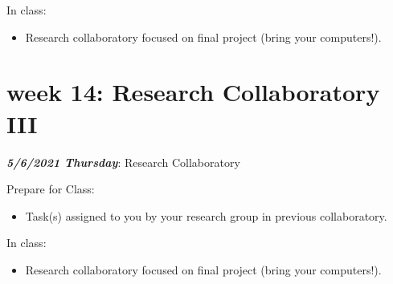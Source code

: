 \documentclass[
]{book}
\providecommand{\tightlist}{%
  \setlength{\itemsep}{0pt}\setlength{\parskip}{0pt}}
\begin{document}
In class:

\begin{itemize}
\tightlist
\item
  Research collaboratory focused on final project (bring your computers!).
\end{itemize}

\hypertarget{week-14-research-collaboratory-iii-1}{%
\chapter{week 14: Research Collaboratory III}\label{week-14-research-collaboratory-iii-1}}

\textbf{\emph{5/6/2021 Thursday}}: Research Collaboratory

Prepare for Class:

\begin{itemize}
\tightlist
\item
  Task(s) assigned to you by your research group in previous collaboratory.
\end{itemize}

In class:

\begin{itemize}
\tightlist
\item
  Research collaboratory focused on final project (bring your computers!).
\end{itemize}

  
\end{document}
